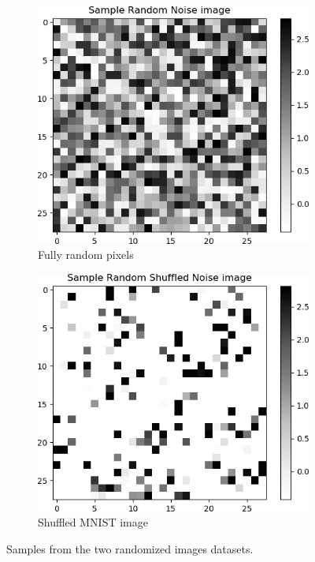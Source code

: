 \documentclass[12pt,oneside]{CUNY_PhD}
\begin{document}
\begin{figure}[!h]
    \centering
    \begin{subfigure}[t]{0.49\textwidth}
        \includegraphics[width=\textwidth]{images/mnist-behavior/Sample-random-noise.png}
        \caption*{Fully random pixels}
    \end{subfigure}
    \begin{subfigure}[t]{0.49\textwidth}
        \includegraphics[width=\textwidth]{images/mnist-behavior/Sample-random-shuffled-noise.png}
        \caption*{Shuffled MNIST image}
    \end{subfigure}
    \caption{Samples from the two randomized images datasets.}
    \label{fig:randoms}
\end{figure}
\end{document}
